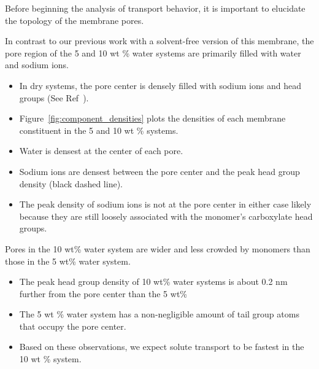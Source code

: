 \documentclass{article}
\begin{document}
  Before beginning the analysis of transport behavior, it is important to elucidate
  the topology of the membrane pores.  
  
  
  In contrast to our previous work with a solvent-free version of this membrane, the pore
  region of the 5 and 10 wt \% water systems are primarily filled with water and sodium
  ions.
  \begin{itemize}
    \item In dry systems, the pore center is densely filled with sodium ions and 
    head groups (See Ref~\cite{coscia_understanding_2019}).
    \item Figure~\ref{fig:component_densities} plots the densities of each
    membrane constituent in the 5 and 10 wt \% systems.
    \item Water is densest at the center of each pore. 
    \item Sodium ions are densest between the pore center and the peak head group density (black dashed line).
    \item The peak density of sodium ions is not at the pore center in either case
    likely because they are still loosely associated with the monomer's 
    carboxylate head groups.
  \end{itemize}
  
  \noindent Pores in the 10 wt\% water system are wider and less crowded by monomers than
  those in the 5 wt\% water system.
  \begin{itemize}
    \item The peak head group density of 10 wt\% water systems is about 0.2 nm
    further from the pore center than the 5 wt\%
    \item The 5 wt \% water system has a non-negligible amount of tail group atoms
    that occupy the pore center.
    \item Based on these observations, we expect solute transport to be fastest 
    in the 10 wt \% system.
  \end{itemize}
  
\end{document}
